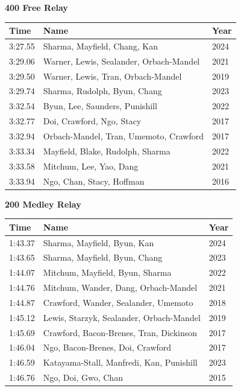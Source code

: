 \vspace{1.2em}
\noindent\begin{minipage}[t]{0.98\textwidth}
\centering
\textbf{\textcolor{teamprimary}{400 Free Relay}}\par
\vspace{0.5em}
\centering
\small
\renewcommand{\arraystretch}{1.0}
\setlength{\tabcolsep}{4pt}
\begin{tabular}{@{}p{4.5cm}p{8.5cm}p{2.5cm}@{}}
\toprule
\textbf{Time} & \textbf{Name} & \textbf{Year} \\
\midrule
3:27.55 & Sharma, Mayfield, Chang, Kan & 2024 \\
3:29.06 & Warner, Lewis, Sealander, Orbach-Mandel & 2021 \\
3:29.50 & Warner, Lewis, Tran, Orbach-Mandel & 2019 \\
3:29.74 & Sharma, Rudolph, Byun, Chang & 2023 \\
3:32.54 & Byun, Lee, Saunders, Punishill & 2022 \\
3:32.77 & Doi, Crawford, Ngo, Stacy & 2017 \\
3:32.94 & Orbach-Mandel, Tran, Umemoto, Crawford & 2017 \\
3:33.34 & Mayfield, Blake, Rudolph, Sharma & 2022 \\
3:33.58 & Mitchum, Lee, Yao, Dang & 2021 \\
3:33.94 & Ngo, Chan, Stacy, Hoffman & 2016 \\
\bottomrule
\end{tabular}
\end{minipage}
\vspace{1.2em}
\noindent\begin{minipage}[t]{0.98\textwidth}
\centering
\textbf{\textcolor{teamprimary}{200 Medley Relay}}\par
\vspace{0.5em}
\centering
\small
\renewcommand{\arraystretch}{1.0}
\setlength{\tabcolsep}{4pt}
\begin{tabular}{@{}p{4.5cm}p{8.5cm}p{2.5cm}@{}}
\toprule
\textbf{Time} & \textbf{Name} & \textbf{Year} \\
\midrule
1:43.37 & Sharma, Mayfield, Byun, Kan & 2024 \\
1:43.65 & Sharma, Mayfield, Byun, Chang & 2023 \\
1:44.07 & Mitchum, Mayfield, Byun, Sharma & 2022 \\
1:44.76 & Mitchum, Wander, Dang, Orbach-Mandel & 2021 \\
1:44.87 & Crawford, Wander, Sealander, Umemoto & 2018 \\
1:45.12 & Lewis, Starzyk, Sealander, Orbach-Mandel & 2019 \\
1:45.69 & Crawford, Bacon-Brenes, Tran, Dickinson & 2017 \\
1:46.04 & Ngo, Bacon-Brenes, Doi, Crawford & 2017 \\
1:46.59 & Katayama-Stall, Manfredi, Kan, Punishill & 2023 \\
1:46.76 & Ngo, Doi, Gwo, Chan & 2015 \\
\bottomrule
\end{tabular}
\end{minipage}

